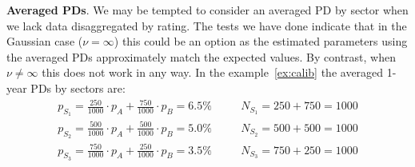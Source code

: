 \documentclass[11pt,fleqn]{book} %
\begin{document}

\textbf{Averaged PDs}. We may be tempted to consider an averaged PD by sector 
when we lack data disaggregated by rating. The tests we have done indicate that 
in the Gaussian case ($\nu = \infty$) this could be an option as the estimated 
parameters using the averaged PDs approximately match the expected values. By 
contrast, when $\nu \ne \infty$ this does not work in any way. 
In the example~\ref{ex:calib} the averaged 1-year PDs by sectors are:
\begin{displaymath}
	\begin{array}{lll}
		p_{S_1} = \frac{250}{1000} \cdot p_A + \frac{750}{1000} \cdot p_B = 6.5\% & \quad & N_{S_1} = 250 + 750 = 1000 \\
		p_{S_2} = \frac{500}{1000} \cdot p_A + \frac{500}{1000} \cdot p_B = 5.0\% & \quad & N_{S_2} = 500 + 500 = 1000 \\
		p_{S_3} = \frac{750}{1000} \cdot p_A + \frac{250}{1000} \cdot p_B = 3.5\% & \quad & N_{S_3} = 750 + 250 = 1000 \\
	\end{array}
\end{displaymath}
\end{document}
